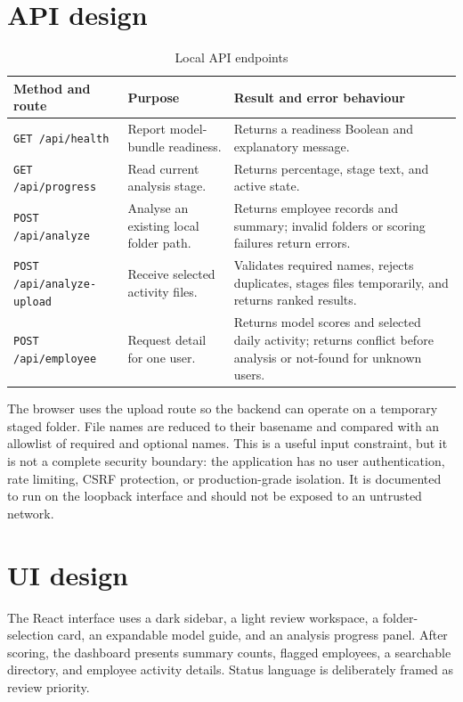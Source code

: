 \documentclass[12pt,a4paper,oneside]{report}
\newcommand{\tablefont}{\small}
\newcommand{\code}[1]{\texttt{\small #1}}
\begin{document}
\section{API design}
\begin{table}[H]
\centering
\tablefont
\caption{Local API endpoints}
\label{tab:api}
\begin{tabularx}{\textwidth}{|p{}|p{}|p{}|}
\hline
\textbf{Method and route} & \textbf{Purpose} & \textbf{Result and error behaviour}\\\hline
\code{GET /api/health} & Report model-bundle readiness. & Returns a readiness Boolean and explanatory message.\\\hline
\code{GET /api/progress} & Read current analysis stage. & Returns percentage, stage text, and active state.\\\hline
\code{POST /api/analyze} & Analyse an existing local folder path. & Returns employee records and summary; invalid folders or scoring failures return errors.\\\hline
\code{POST /api/analyze-upload} & Receive selected activity files. & Validates required names, rejects duplicates, stages files temporarily, and returns ranked results.\\\hline
\code{POST /api/employee} & Request detail for one user. & Returns model scores and selected daily activity; returns conflict before analysis or not-found for unknown users.\\\hline
\end{tabularx}
\end{table}

The browser uses the upload route so the backend can operate on a
temporary staged folder. File names are reduced to their basename and
compared with an allowlist of required and optional names. This is a
useful input constraint, but it is not a complete security boundary:
the application has no user authentication, rate limiting, CSRF
protection, or production-grade isolation. It is documented to run on
the loopback interface and should not be exposed to an untrusted
network.

\section{UI design}
The React interface uses a dark sidebar, a light review workspace, a
folder-selection card, an expandable model guide, and an analysis
progress panel. After scoring, the dashboard presents summary counts,
flagged employees, a searchable directory, and employee activity
details. Status language is deliberately framed as review priority.
\end{document}
